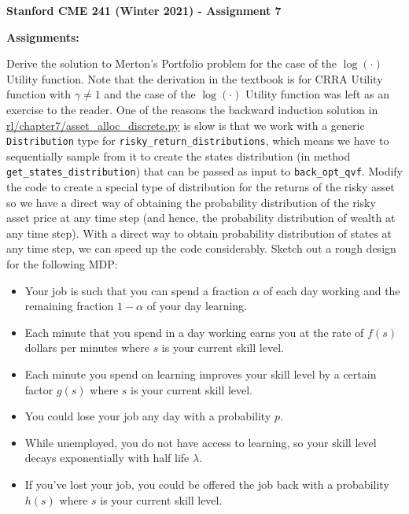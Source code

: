 \documentclass[12pt]{exam}
\begin{document}
\begin{center}
{\large {\bf Stanford CME 241 (Winter 2021) - Assignment 7}}
\end{center}
 
{\large{\bf Assignments:}}
\begin{questions}
\question Derive the solution to Merton's Portfolio problem for the case of the $\log(\cdot)$ Utility function. Note that the derivation in the textbook is for CRRA Utility function with $\gamma \neq 1$ and the case of the $\log(\cdot)$ Utility function was left as an exercise to the reader.
 One of the reasons the backward induction solution in \href{https://github.com/TikhonJelvis/RL-book/blob/master/rl/chapter7/asset_alloc_discrete.py}{rl\//chapter7\//asset\_alloc\_discrete.py} is slow is that we work with a generic \lstinline{Distribution} type for \lstinline{risky_return_distributions}, which means we have to sequentially sample from it to create the states distribution (in method \lstinline{get_states_distribution}) that can be passed as input to \lstinline{back_opt_qvf}. Modify the code to create a special type of distribution for the returns of the risky asset so we have a direct way of obtaining the probability distribution of the risky asset price at any time step (and hence, the probability distribution of wealth at any time step). With a direct way to obtain probability distribution of states at any time step, we can speed up the code considerably. 
\question Sketch out a rough design for the following MDP:
\begin{itemize}
\item Your job is such that you can spend a fraction $\alpha$ of each day working and the remaining fraction $1-\alpha$ of your day learning.
\item Each minute that you spend in a day working earns you at the rate of $f(s)$ dollars per minutes where $s$ is your current skill level.
\item Each minute you spend on learning improves your skill level by a certain factor $g(s)$ where $s$ is your current skill level.
\item You could lose your job any day with a probability $p$.
\item While unemployed, you do not have access to learning, so your skill level decays exponentially with half life $\lambda$.
\item If you've lost your job, you could be offered the job back with a probability $h(s)$ where $s$ is your current skill level.
\end{itemize}


\end{questions}
\end{document}
